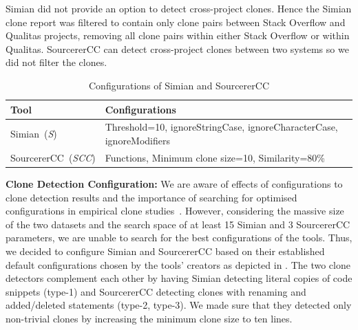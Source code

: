 \documentclass[10pt,journal,compsoc]{IEEEtran}
\begin{document}
Simian did not provide an option to detect cross-project clones. Hence the
Simian clone report was filtered to contain only clone pairs between Stack
Overflow and Qualitas projects, removing all clone pairs within either Stack
Overflow or within Qualitas. 
SourcererCC can detect cross-project clones between two systems so we did
not filter the clones.

\begin{table}
	\centering
	\caption{Configurations of Simian and SourcererCC}
	\label{tab:clone_config}
	\begin{tabular}{lp{5cm}}
		\toprule
		Tool & Configurations \\
		\midrule
		Simian~(\textit{S}) &  Threshold=10, ignoreStringCase, \newline ignoreCharacterCase, \newline ignoreModifiers \\ 
		\midrule
		SourcererCC~(\textit{SCC}) & Functions, Minimum clone size=10, \newline Similarity=80\% \\
		\bottomrule
	\end{tabular} %
\end{table}

\textbf{Clone Detection Configuration: } We are aware of effects of
configurations to clone detection results and the importance of searching for
optimised configurations in empirical clone
studies~\cite{Svajlenko2014,Wang2014,cr2016ssbse,Ragkhitwetsagul2016, emse}. However,
considering the massive size of the two datasets and the search space of at
least 15 Simian and 3 SourcererCC parameters, we are unable to search for the
best configurations of the tools. Thus, we decided to configure Simian and
SourcererCC based on their established default configurations chosen by the
tools' creators as depicted in . 
The two clone detectors complement each
other by having Simian detecting literal copies of code snippets (type-1) and SourcererCC
detecting clones with renaming and added/deleted statements (type-2, type-3). We made sure that they 
detected only non-trivial clones by increasing the minimum clone size to ten
lines.
\end{document}
